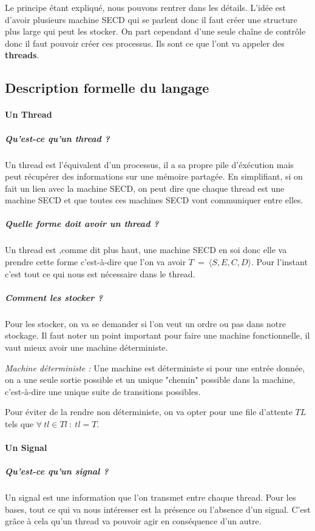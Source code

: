 \documentclass[10pt,a4paper]{report}
\begin{document}
Le principe étant expliqué, nous pouvons rentrer dans les détails. L'idée est d'avoir plusieurs machine SECD qui se parlent donc il faut créer une structure plus large qui peut les stocker. On part cependant d'une seule chaîne de contrôle donc il faut pouvoir créer ces processus. Ils sont ce que l'ont va appeler des \textbf{threads}.
\bigbreak

\subsection{Description formelle du langage}

\paragraph{Un Thread}

\subparagraph{Qu'est-ce qu'un thread ?}
Un thread est l'équivalent d'un processus, il a sa propre pile d'éxécution mais peut récupérer des informations sur une mémoire partagée. En simplifiant, si on fait un lien avec la machine SECD, on peut dire que chaque thread est une machine SECD et que toutes ces machines SECD vont communiquer entre elles.

\subparagraph{Quelle forme doit avoir un thread ?} 
Un thread est ,comme dit plus haut, une machine SECD en soi donc elle va prendre cette forme c'est-à-dire que l'on va avoir $T~=~\langle S,E,C,D\rangle$. Pour l'instant c'est tout ce qui nous est nécessaire dans le thread.

\subparagraph{Comment les stocker ?}
Pour les stocker, on va se demander si l'on veut un ordre ou pas dans notre stockage. Il faut noter un point important pour faire une machine fonctionnelle, il vaut mieux avoir une machine déterministe.
\medbreak

\textit{Machine déterministe :} Une machine est déterministe si pour une entrée donnée, on a une seule sortie possible et un unique "chemin" possible dans la machine, c'est-à-dire une unique suite de transitions possibles.
\medbreak

Pour éviter de la rendre non déterministe, on va opter pour une file d'attente $TL$ tels que $\forall~tl \in Tl~:~tl = T$.
\bigbreak

\paragraph{Un Signal} 

\subparagraph{Qu'est-ce qu'un signal ?}
Un signal est une information que l'on transmet entre chaque thread. Pour les bases, tout ce qui va nous intéresser est la présence ou l'absence d'un signal. C'est grâce à cela qu'un thread va pouvoir agir en conséquence d'un autre. 
\end{document}
